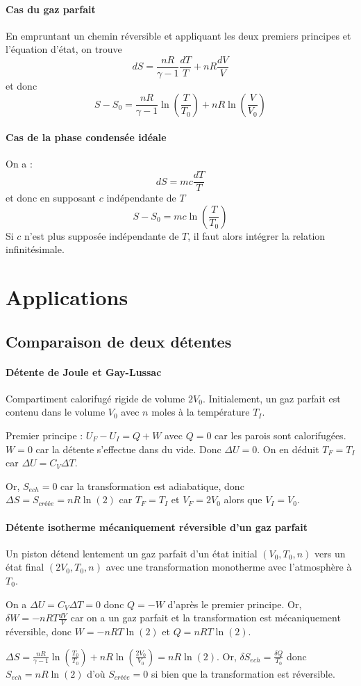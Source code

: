 \documentclass[french]{book}
\theoremstyle{plain}
\theoremstyle{definition}
\theoremstyle{remark}
\begin{document}
\paragraph{Cas du gaz parfait}En empruntant un chemin réversible et appliquant les deux premiers principes et l'équation d'état, on trouve $$dS=\frac{nR}{\gamma-1}\frac{dT}{T}+nR\frac{dV}{V}$$ et donc $$S-S_0=\frac{nR}{\gamma-1}\ln\left(\frac{T}{T_0}\right)+nR\ln\left(\frac{V}{V_0}\right)$$ \paragraph{Cas de la phase condensée idéale}On a : $$dS=mc\frac{dT}{T}$$ et donc en supposant $c$ indépendante de $T$ $$S-S_0=mc\ln\left(\frac{T}{T_0}\right)$$ Si $c$ n'est plus supposée indépendante de $T$, il faut alors intégrer la relation infinitésimale.
\section{Applications}
\subsection{Comparaison de deux détentes}
\paragraph{Détente de Joule et Gay-Lussac}
Compartiment calorifugé rigide de volume $2V_0$. Initialement, un gaz parfait est contenu dans le volume $V_0$ avec $n$ moles à la température $T_I$. \\ \par Premier principe : $U_F-U_I=Q+W$ avec $Q=0$ car les parois sont calorifugées. $W=0$ car la détente s'effectue dans du vide. Donc $\Delta U=0$. On en déduit $T_F=T_I$ car $\Delta U=C_V\Delta T$. \\ \par Or, $S_{ech}=0$ car la transformation est adiabatique, donc $\Delta S=S_{créée}=nR\ln(2)$ car $T_F=T_I$ et $V_F=2V_0$ alors que $V_I=V_0$.
\paragraph{Détente isotherme mécaniquement réversible d'un gaz parfait}Un piston détend lentement un gaz parfait d'un état initial $(V_0,T_0,n)$ vers un état final $(2V_0,T_0,n)$ avec une transformation monotherme avec l'atmosphère à $T_0$. \\ \par On a $\Delta U=C_V\Delta T=0$ donc $Q=-W$ d'après le premier principe. Or, $\delta W=-nRT\displaystyle\frac{dV}{V}$ car on a un gaz parfait et la transformation est mécaniquement réversible, donc $W=-nRT\ln(2)$ et $Q=nRT\ln(2)$. \\ \par $\displaystyle\Delta S=\frac{nR}{\gamma-1}\ln\left(\frac{T_0}{T_0}\right)+nR\ln\left(\frac{2V_0}{V_0}\right)=nR\ln(2)$. Or, $\delta S_{ech}=\displaystyle\frac{\delta Q}{T_0}$ donc $S_{ech}=nR\ln(2)$ d'où $S_{créée}=0$ si bien que la transformation est réversible.
\end{document}
